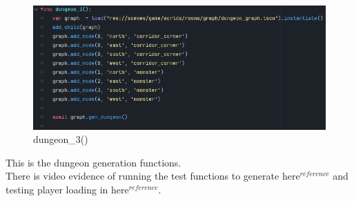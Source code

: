 \documentclass{article}
\begin{document}
                \begin{figure}[H]
                        \centering
                        \includegraphics[width = 0.8\columnwidth]{images/development/RoomTest_dungeon_3.PNG}
                        \caption{dungeon\_3()}
                \end{figure} 
        This is the dungeon generation functions.\\
        There is video evidence of running the test functions to generate here$^{reference}$ and testing player loading in here$^{reference}$.
\end{document}
